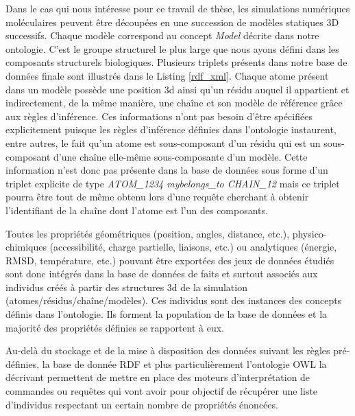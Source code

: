 Dans le cas qui nous intéresse pour ce travail de thèse, les simulations numériques moléculaires peuvent être découpées en une succession de modèles statiques 3D successifs. Chaque modèle correspond au concept \textit{Model} décrite dans notre ontologie. C'est le groupe structurel le plus large que nous ayons défini dans les composants structurels biologiques. Plusieurs triplets présents dans notre base de données finale sont illustrés dans le Listing \ref{rdf_xml}. Chaque atome présent dans un modèle possède une position 3d ainsi qu'un résidu auquel il appartient et indirectement, de la même manière, une chaîne et son modèle de référence grâce aux règles d'inférence. Ces informations n'ont pas besoin d'être spécifiées explicitement puisque les règles d'inférence définies dans l'ontologie instaurent, entre autres, le fait qu'un atome est sous-composant d'un résidu qui est un sous-composant d'une chaîne elle-même sous-composante d'un modèle. 
Cette information n'est donc pas présente dans la base de données sous forme d'un triplet explicite de type \textit{ATOM\_1234 my\:belongs\_to CHAIN\_12} mais ce triplet pourra être tout de même obtenu lors d'une requête cherchant à obtenir l'identifiant de la chaîne dont l'atome est l'un des composants. 

Toutes les propriétés géométriques (position, angles, distance, etc.), physico-chimiques (accessibilité, charge partielle, liaisons, etc.) ou analytiques (énergie, RMSD, température, etc.) pouvant être exportées des jeux de données étudiés sont donc intégrés dans la base de données de faits et surtout associés aux individus créés à partir des structures 3d de la simulation (atomes/résidus/chaîne/modèles). Ces individus sont des instances des concepts définis dans l'ontologie. Ils forment la population de la base de données et la majorité des propriétés définies se rapportent à eux.

Au-delà du stockage et de la mise à disposition des données suivant les règles pré-définies, la base de donnée RDF et plus particulièrement l'ontologie OWL la décrivant permettent de mettre en place des moteurs d'interprétation de commandes ou requêtes qui vont avoir pour objectif de récupérer une liste d'individus respectant un certain nombre de propriétés énoncées.

